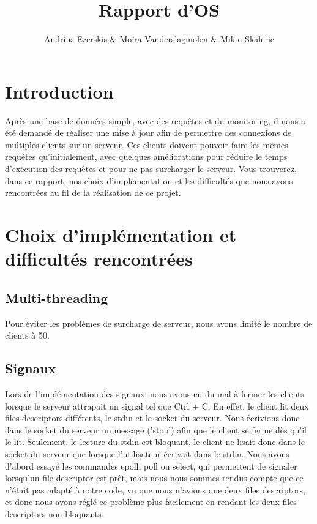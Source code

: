\documentclass[utf8]{article}
\begin{document}
\begin{titlepage}
    

\author{Andrius Ezerskis \& Moïra Vanderslagmolen \& Milan Skaleric}
\title{Rapport d'OS}

\maketitle
\end{titlepage}

\section{Introduction}
\par
Après une base de données simple, avec des requêtes et du monitoring, il nous a été demandé de réaliser une mise à jour afin de permettre des connexions de multiples clients sur un serveur.\newline
Ces clients doivent pouvoir faire les mêmes requêtes qu'initialement, avec quelques améliorations pour réduire le temps d'exécution des requêtes et pour ne pas surcharger le serveur.
Vous trouverez, dans ce rapport, nos choix d'implémentation et les difficultés que nous avons rencontrées au fil de la réalisation de ce projet.
\section{Choix d'implémentation et difficultés rencontrées}
\subsection{Multi-threading}
Pour éviter les problèmes de surcharge de serveur, nous avons limité le nombre de clients à 50.
\subsection{Signaux}
\par
\indent
Lors de l'implémentation des signaux, nous avons eu du mal à fermer les clients lorsque le serveur attrapait un signal tel que Ctrl + C. 
En effet, le client lit deux files descriptors différents, le stdin et le socket du serveur. Nous écrivions donc dans le socket du serveur un message ('stop')
afin que le client se ferme dès qu'il le lit. Seulement, le lecture du stdin est bloquant, le client ne lisait donc dans le socket du serveur que lorsque l'utilisateur
écrivait dans le stdin. 
Nous avons d'abord essayé les commandes epoll, poll ou select, qui permettent de signaler lorsqu'un file descriptor est prêt, mais nous nous sommes rendus compte que
ce n'était pas adapté à notre code, vu que nous n'avions que deux files descriptors, et donc nous avons réglé ce problème plus facilement en rendant les deux files descriptors non-bloquants.
\par
\end{document}
